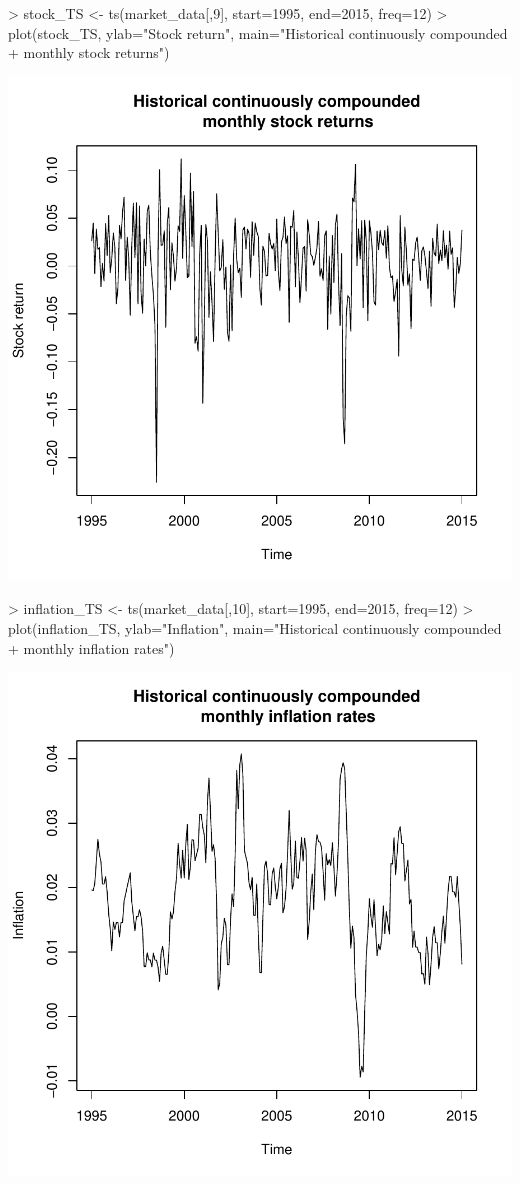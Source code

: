 \documentclass[11pt]{article}
\begin{document}
\begin{Schunk}
\begin{Sinput}
> stock_TS <- ts(market_data[,9], start=1995, end=2015, freq=12)
> plot(stock_TS, ylab="Stock return", main="Historical continuously compounded
+      monthly stock returns")
\end{Sinput}
\end{Schunk}
\includegraphics{var_canada_summary-002}

\begin{Schunk}
\begin{Sinput}
> inflation_TS <- ts(market_data[,10], start=1995, end=2015, freq=12)
> plot(inflation_TS, ylab="Inflation", main="Historical continuously compounded
+      monthly inflation rates")
\end{Sinput}
\end{Schunk}
\includegraphics{var_canada_summary-003}
\end{document}
